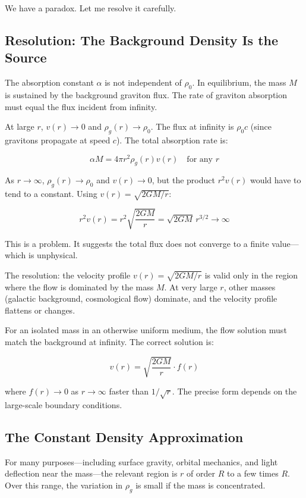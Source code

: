\documentclass[12pt, a4paper]{article}
\begin{document}
We have a paradox. Let me resolve it carefully.

\subsection{Resolution: The Background Density Is the Source}
\label{subsec:background_source}

The absorption constant \( \alpha \) is not independent of \( \rho_0 \). In equilibrium, the mass \( M \) is sustained by the background graviton flux. The rate of graviton absorption must equal the flux incident from infinity.

At large \( r \), \( v(r) \to 0 \) and \( \rho_g(r) \to \rho_0 \). The flux at infinity is \( \rho_0 c \) (since gravitons propagate at speed \( c \)). The total absorption rate is:

\[
\alpha M = 4\pi r^2 \rho_g(r) v(r) \quad \text{for any } r
\]

As \( r \to \infty \), \( \rho_g(r) \to \rho_0 \) and \( v(r) \to 0 \), but the product \( r^2 v(r) \) would have to tend to a constant. Using \( v(r) = \sqrt{2GM/r} \):

\[
r^2 v(r) = r^2 \sqrt{\frac{2GM}{r}} = \sqrt{2GM} \, r^{3/2} \to \infty
\]

This is a problem. It suggests the total flux does not converge to a finite value—which is unphysical.

The resolution: the velocity profile \( v(r) = \sqrt{2GM/r} \) is valid only in the region where the flow is dominated by the mass \( M \). At very large \( r \), other masses (galactic background, cosmological flow) dominate, and the velocity profile flattens or changes.

For an isolated mass in an otherwise uniform medium, the flow solution must match the background at infinity. The correct solution is:

\[
v(r) = \sqrt{\frac{2GM}{r}} \cdot f(r)
\]

where \( f(r) \to 0 \) as \( r \to \infty \) faster than \( 1/\sqrt{r} \). The precise form depends on the large-scale boundary conditions.

\subsection{The Constant Density Approximation}
\label{subsec:constant_density}

For many purposes—including surface gravity, orbital mechanics, and light deflection near the mass—the relevant region is \( r \) of order \( R \) to a few times \( R \). Over this range, the variation in \( \rho_g \) is small if the mass is concentrated.
\end{document}
